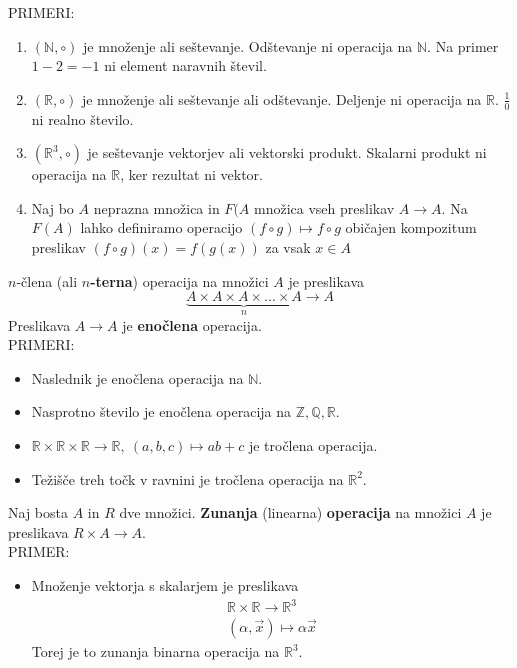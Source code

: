 \documentclass[a4paper,12pt]{article}
\begin{document}
\noindent PRIMERI: 
\begin{enumerate}
\item $(\mathbb{N}, \circ)$ je množenje ali seštevanje. Odštevanje ni operacija na $\mathbb{N}$. Na primer $1-2=-1$ ni element naravnih števil.
\item $(\mathbb{R}, \circ)$ je množenje ali seštevanje ali odštevanje. Deljenje ni operacija na $\mathbb{R}$. $\frac{1}{0}$ ni realno število.
\item $(\mathbb{R}^3, \circ)$ je seštevanje vektorjev ali vektorski produkt. Skalarni produkt ni operacija na $\mathbb{R}$, ker rezultat ni vektor.
\item Naj bo $A$ neprazna množica in $F(A$ množica vseh preslikav $A \to A$. Na $F(A)$ lahko definiramo operacijo $(f \circ g) \mapsto f \circ g$ običajen kompozitum preslikav $(f \circ g)(x)=f(g(x))$ za vsak $ x \in A$
\end{enumerate}

\noindent $n$-člena (ali \textbf{$n$-terna}) operacija na množici $A$ je preslikava 
$$\underbrace{A \times A \times A \times ... \times A}_{n} \to A$$ Preslikava $A \to A$ je \textbf{enočlena} operacija. \\

\noindent PRIMERI:
\begin{itemize}
\item Naslednik je enočlena operacija na $\mathbb{N}$.
\item Nasprotno število je enočlena operacija na $\mathbb{Z}, \mathbb{Q}, \mathbb{R}$.
\item $\mathbb{R} \times \mathbb{R} \times \mathbb{R} \rightarrow \mathbb{R},~(a,b,c) \mapsto ab+c$ je tročlena operacija.
\item Težišče treh točk v ravnini je tročlena operacija na $\mathbb{R}^2$.\\
\end{itemize}

\noindent Naj bosta $A$ in $R$ dve množici. \textbf{Zunanja} (linearna) \textbf{operacija} na množici $A$ je preslikava $R \times A \to A$. \\


\noindent PRIMER:
\begin{itemize}
\item Množenje vektorja s skalarjem je preslikava 
\begin{eqnarray*} 
\mathbb{R} \times \mathbb{R} \to \mathbb{R}^3 \\
(\alpha,\vec{x})\mapsto \alpha \vec{x}
\end{eqnarray*}
Torej je to zunanja binarna operacija na $\mathbb{R}^3$.
\end{itemize}
\end{document}
